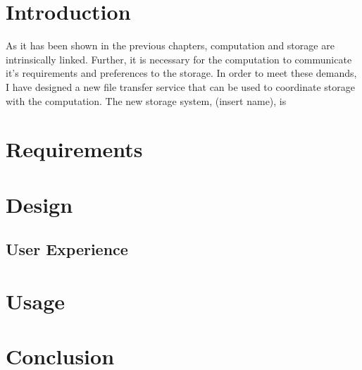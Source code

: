 \label{chapter:coordinatingstorage}


\section{Introduction}

As it has been shown in the previous chapters, computation and storage are intrinsically linked.  Further, it is necessary for the computation to communicate it's requirements and preferences to the storage.  In order to meet these demands, I have designed a new file transfer service that can be used to coordinate storage with the computation.  The new storage system, (insert name), is  

\section{Requirements}

\section{Design}


\subsection{User Experience}

\section{Usage}


\section{Conclusion}




